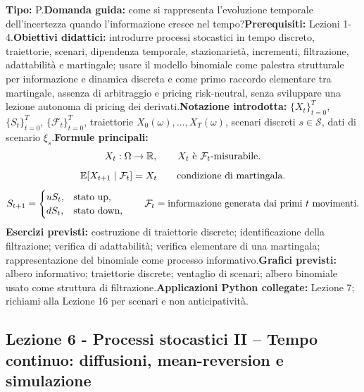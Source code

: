 \documentclass[12pt,a4paper]{article}%
\newcommand{\1}{\mathbf{1}}
\begin{document}
\textbf{Tipo:} P.\newline\textbf{Domanda guida:} come si rappresenta
l'evoluzione temporale dell'incertezza quando l'informazione cresce nel
tempo?\newline\textbf{Prerequisiti:} Lezioni 1-4.\newline\textbf{Obiettivi
didattici:} introdurre processi stocastici in tempo discreto, traiettorie,
scenari, dipendenza temporale, stazionariet\`{a}, incrementi, filtrazione,
adattabilit\`{a} e martingale; usare il modello binomiale come palestra
strutturale per informazione e dinamica discreta e come primo raccordo
elementare tra martingale, assenza di arbitraggio e pricing risk-neutral,
senza sviluppare una lezione autonoma di pricing dei derivati.\newline\textbf{Notazione introdotta:}
$\{X_{t}\}_{t=0}^{T}$, $\{S_{t}\}_{t=0}^{T}$, $\{\mathcal{F}_{t}\}_{t=0}^{T}$,
traiettorie $X_{0}(\omega),\ldots,X_{T}(\omega)$, scenari discreti
$s\in\mathcal{S}$, dati di scenario $\xi_{s}$.\newline\textbf{Formule
principali:}
\[
X_{t}:\Omega\rightarrow\mathbb{R}, \qquad X_{t} \hbox{ \`{e} } \mathcal{F}%
_{t}\hbox{-misurabile}.
\]
\[
\mathbb{E}[X_{t+1}\mid\mathcal{F}_{t}]=X_{t} \qquad
\hbox{condizione di martingala}.
\]
\[
S_{t+1}=%
\begin{cases}
u S_{t}, & \hbox{stato up},\\
dS_{t}, & \hbox{stato down},
\end{cases}
\qquad\mathcal{F}_{t}%
=\hbox{informazione generata dai primi }t\hbox{ movimenti}.
\]
\textbf{Esercizi previsti:} costruzione di traiettorie discrete;
identificazione della filtrazione; verifica di adattabilit\`{a}; verifica
elementare di una martingala; rappresentazione del binomiale come processo
informativo.\newline\textbf{Grafici previsti:} albero informativo; traiettorie
discrete; ventaglio di scenari; albero binomiale usato come struttura di
filtrazione.\newline\textbf{Applicazioni Python collegate:} Lezione 7;
richiami alla Lezione 16 per scenari e non anticipativit\`{a}.

\subsection{Lezione 6 - Processi stocastici II -- Tempo continuo: diffusioni,
mean-reversion e simulazione}
\end{document}
